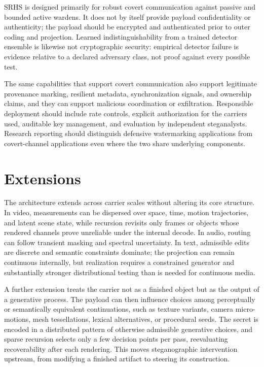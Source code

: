 \documentclass[11pt]{article}
\begin{document}
SRHS is designed primarily for robust covert communication against passive and bounded active wardens. It does not by itself provide payload confidentiality or authenticity; the payload should be encrypted and authenticated prior to outer coding and projection. Learned indistinguishability from a trained detector ensemble is likewise not cryptographic security: empirical detector failure is evidence relative to a declared adversary class, not proof against every possible test.

The same capabilities that support covert communication also support legitimate provenance marking, resilient metadata, synchronization signals, and ownership claims, and they can support malicious coordination or exfiltration. Responsible deployment should include rate controls, explicit authorization for the carriers used, auditable key management, and evaluation by independent steganalysts. Research reporting should distinguish defensive watermarking applications from covert-channel applications even where the two share underlying components.

\section{Extensions}

The architecture extends across carrier scales without altering its core structure. In video, measurements can be dispersed over space, time, motion trajectories, and latent scene state, while recursion revisits only frames or objects whose rendered channels prove unreliable under the internal decode. In audio, routing can follow transient masking and spectral uncertainty. In text, admissible edits are discrete and semantic constraints dominate; the projection can remain continuous internally, but realization requires a constrained generator and substantially stronger distributional testing than is needed for continuous media.

A further extension treats the carrier not as a finished object but as the output of a generative process. The payload can then influence choices among perceptually or semantically equivalent continuations, such as texture variants, camera micro-motions, mesh tessellations, lexical alternatives, or procedural seeds. The secret is encoded in a distributed pattern of otherwise admissible generative choices, and sparse recursion selects only a few decision points per pass, reevaluating recoverability after each rendering. This moves steganographic intervention upstream, from modifying a finished artifact to steering its construction.
\end{document}

